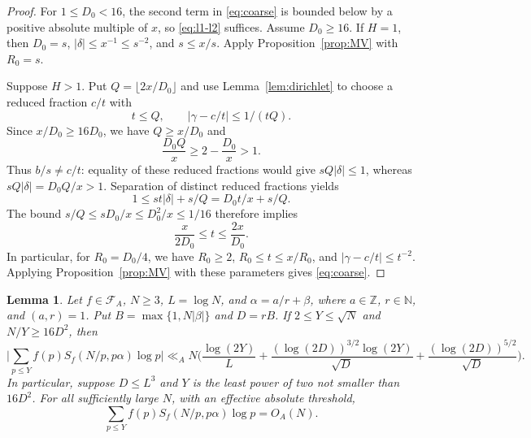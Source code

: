 \documentclass[11pt]{amsart}
\numberwithin{equation}{section}
\numberwithin{figure}{section}
\newtheorem{lemma}{Lemma}[section]
\theoremstyle{definition}
\newcommand{\Z}{\mathbb{Z}}
\newcommand{\N}{\mathbb{N}}
\newcommand{\FA}{\mathcal F_A}
\begin{document}
\begin{proof}
For $1\le D_0<16$, the second term in \eqref{eq:coarse} is bounded
below by a positive absolute multiple of $x$, so \eqref{eq:l1-l2}
suffices. Assume $D_0\ge16$.
If $H=1$, then $D_0=s$, $|\delta|\le x^{-1}\le s^{-2}$, and
$s\le x/s$. Apply Proposition~\ref{prop:MV} with $R_0=s$.

Suppose $H>1$. Put $Q=\lfloor2x/D_0\rfloor$ and use
Lemma~\ref{lem:dirichlet} to choose a reduced fraction $c/t$ with
\[
 t\le Q,\qquad |\gamma-c/t|\le1/(tQ).
\]
Since $x/D_0\ge16D_0$, we have $Q\ge x/D_0$ and
\[
 \frac{D_0Q}{x}\ge2-\frac{D_0}{x}>1.
\]
Thus $b/s\ne c/t$: equality of these reduced fractions would give
$sQ|\delta|\le1$, whereas $sQ|\delta|=D_0Q/x>1$.
Separation of distinct reduced fractions yields
\[
 1\le st|\delta|+s/Q=D_0t/x+s/Q.
\]
The bound $s/Q\le sD_0/x\le D_0^2/x\le1/16$ therefore implies
\[
 \frac{x}{2D_0}\le t\le\frac{2x}{D_0}.
\]
In particular, for $R_0=D_0/4$, we have $R_0\ge2$,
$R_0\le t\le x/R_0$, and $|\gamma-c/t|\le t^{-2}$.
Applying Proposition~\ref{prop:MV} with these parameters gives \eqref{eq:coarse}.
\end{proof}

\begin{lemma}\label{lem:small}
Let $f\in\FA$, $N\ge3$, $L=\log N$, and
$\alpha=a/r+\beta$, where $a\in\Z$, $r\in\N$, and $(a,r)=1$.
Put $B=\max\{1,N|\beta|\}$ and $D=rB$.
If $2\le Y\le\sqrt N$ and $N/Y\ge16D^2$, then
\begin{equation}\label{eq:small-primes-general}
 \bigg|\sum_{p\le Y}f(p)S_f(N/p,p\alpha)\log p\bigg|
 \ll_A N\bigg(\frac{\log(2Y)}L
 +\frac{(\log(2D))^{3/2}\log(2Y)}{\sqrt D}
 +\frac{(\log(2D))^{5/2}}{\sqrt D}\bigg).
\end{equation}
In particular, suppose $D\le L^3$ and $Y$ is the least power of two
not smaller than $16D^2$. For all sufficiently large $N$, with an
effective absolute threshold,
\begin{equation}\label{eq:small-primes}
 \sum_{p\le Y}f(p)S_f(N/p,p\alpha)\log p=O_A(N).
\end{equation}
\end{lemma}
\end{document}
